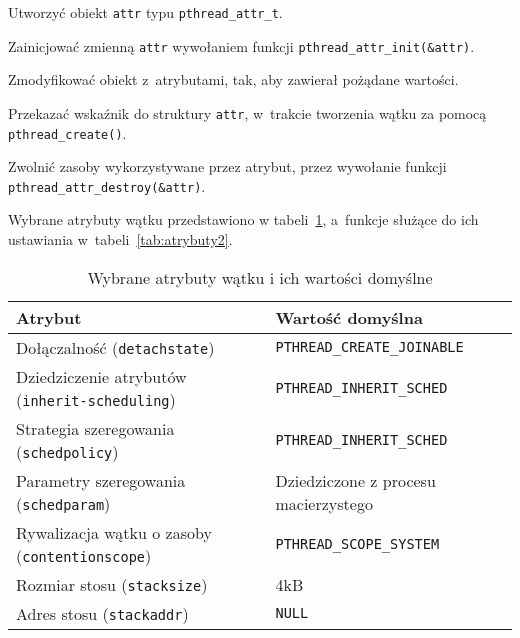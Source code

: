 \begin{myitemize}
\item Utworzyć obiekt \lstinline[style=MyCStyle]{attr} typu \lstinline[style=MyCStyle]{pthread_attr_t}.
\item Zainicjować zmienną \lstinline[style=MyCStyle]{attr} wywołaniem funkcji \lstinline[style=MyCStyle]{pthread_attr_init(&attr)}.
\item Zmodyfikować obiekt z~atrybutami, tak, aby zawierał pożądane wartości.
\item Przekazać wskaźnik do struktury \lstinline[style=MyCStyle]{attr}, w~trakcie tworzenia wątku za pomocą \lstinline[style=MyCStyle]{pthread_create()}.
\item Zwolnić zasoby wykorzystywane przez atrybut, przez wywołanie funkcji \mbox{\lstinline[style=MyCStyle]{pthread_attr_destroy(&attr)}}.
\end{myitemize}

Wybrane atrybuty wątku przedstawiono w tabeli~\ref{tab:atrybuty1}, a~funkcje służące do ich ustawiania w~tabeli~\ref{tab:atrybuty2}.

\begin{table}[h!]
\centering
\caption{Wybrane atrybuty wątku i ich wartości domyślne}
\setlength{\arrayrulewidth}{1pt}
\setlength{\tabcolsep}{6pt}
\renewcommand{\arraystretch}{1.2}
\begin{tabular}{ |p{}|p{}| }
\hline \rowcolor{gray}
\textbf{Atrybut} & \textbf{Wartość domyślna} \\ \hline
Dołączalność (\mbox{\lstinline[style=MyCStyle]{detachstate}}) & \mbox{\lstinline[style=MyCStyle]{PTHREAD_CREATE_JOINABLE}} \\ \hline
Dziedziczenie atrybutów (\mbox{\lstinline[style=MyCStyle]{inherit-scheduling}}) & \mbox{\lstinline[style=MyCStyle]{PTHREAD_INHERIT_SCHED}} \\ \hline
Strategia szeregowania (\mbox{\lstinline[style=MyCStyle]{schedpolicy}}) & \mbox{\lstinline[style=MyCStyle]{PTHREAD_INHERIT_SCHED}} \\ \hline
Parametry szeregowania (\mbox{\lstinline[style=MyCStyle]{schedparam}}) & Dziedziczone z procesu macierzystego \\ \hline
Rywalizacja wątku o zasoby (\mbox{\lstinline[style=MyCStyle]{contentionscope}}) & \mbox{\lstinline[style=MyCStyle]{PTHREAD_SCOPE_SYSTEM}} \\ \hline
Rozmiar stosu (\mbox{\lstinline[style=MyCStyle]{stacksize}}) & 4kB \\ \hline
Adres stosu (\mbox{\lstinline[style=MyCStyle]{stackaddr}}) & \mbox{\lstinline[style=MyCStyle]{NULL}} \\ \hline
\end{tabular}
\label{tab:atrybuty1}
\end{table}


